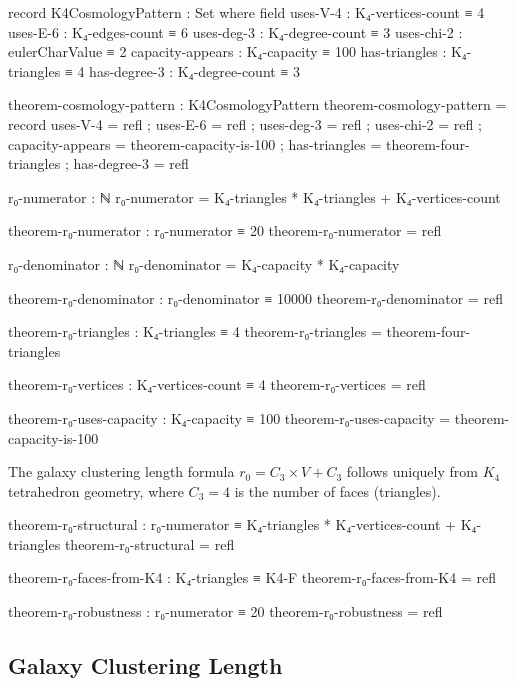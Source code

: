 \documentclass[11pt,a4paper]{book}
\begin{document}
\begin{code}
record K4CosmologyPattern : Set where
  field
    uses-V-4          : K₄-vertices-count ≡ 4
    uses-E-6          : K₄-edges-count ≡ 6
    uses-deg-3        : K₄-degree-count ≡ 3
    uses-chi-2        : eulerCharValue ≡ 2
    capacity-appears  : K₄-capacity ≡ 100
    has-triangles     : K₄-triangles ≡ 4
    has-degree-3      : K₄-degree-count ≡ 3

theorem-cosmology-pattern : K4CosmologyPattern
theorem-cosmology-pattern = record
  { uses-V-4         = refl
  ; uses-E-6         = refl
  ; uses-deg-3       = refl
  ; uses-chi-2       = refl
  ; capacity-appears = theorem-capacity-is-100
  ; has-triangles    = theorem-four-triangles
  ; has-degree-3     = refl
  }
\end{code}

\begin{code}
r₀-numerator : ℕ
r₀-numerator = K₄-triangles * K₄-triangles + K₄-vertices-count

theorem-r₀-numerator : r₀-numerator ≡ 20
theorem-r₀-numerator = refl

r₀-denominator : ℕ
r₀-denominator = K₄-capacity * K₄-capacity

theorem-r₀-denominator : r₀-denominator ≡ 10000
theorem-r₀-denominator = refl
\end{code}

\begin{code}
theorem-r₀-triangles : K₄-triangles ≡ 4
theorem-r₀-triangles = theorem-four-triangles

theorem-r₀-vertices : K₄-vertices-count ≡ 4
theorem-r₀-vertices = refl

theorem-r₀-uses-capacity : K₄-capacity ≡ 100
theorem-r₀-uses-capacity = theorem-capacity-is-100
\end{code}

The galaxy clustering length formula $r_0 = C_3 \times V + C_3$ follows uniquely from 
$K_4$ tetrahedron geometry, where $C_3 = 4$ is the number of faces (triangles).

\begin{code}
theorem-r₀-structural : r₀-numerator ≡ K₄-triangles * K₄-vertices-count + K₄-triangles
theorem-r₀-structural = refl

theorem-r₀-faces-from-K4 : K₄-triangles ≡ K4-F
theorem-r₀-faces-from-K4 = refl

theorem-r₀-robustness : r₀-numerator ≡ 20
theorem-r₀-robustness = refl
\end{code}

\subsection{Galaxy Clustering Length}
\end{document}
